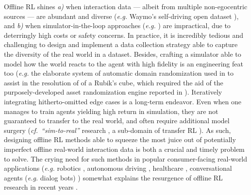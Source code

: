Offline RL shines
\textit{a)} when interaction data --- albeit from multiple non-egocentric sources --- are abundant and diverse
(\textit{e.g.} Waymo's self-driving open dataset \cite{Sun2019-qc}), and
\textit{b)} when simulator-in-the-loop approaches
(\textit{e.g.} \cite{Ajay2019-lv, Zhou2020-hs})
are impractical, due to deterringly high costs or safety concerns.
In practice, it is incredibly tedious and challenging to design and implement
a data collection strategy able to capture the
diversity of the real world in a dataset.
Besides, crafting a simulator able to model how the world reacts to the agent with high fidelity
is an engineering feat too
(\textit{e.g.} the elaborate system of automatic domain randomization used in \cite{OpenAI2019-vy}
to assist in the resolution of of a Rubik's cube, which required the aid of the purposely-developed
asset randomization engine reported in \cite{Chociej2019-ot}).
Iteratively integrating hitherto-omitted edge cases is a long-term endeavor.
Even when one manages to train agents yielding high return in simulation, they are not guaranteed to
transfer to the real world, and often require additional model surgery
(\textit{cf.}~\textit{``sim-to-real''} research
\cite{Heiden2021-fb, Ho2020-qs, Smith2019-ns, James2018-pe, OpenAI2018-sm,
Tan2018-ux, Bousmalis2017-fm, Tobin2017-ir, Rusu2016-dc},
a sub-domain of transfer RL
\cite{Taylor2009-pc, Parisotto2016-fo, Barreto2016-ey, Gupta2017-fd,
Berseth2018-lc, Wang2018-ot, Nichol2018-gr, Gamrian2019-ok, Peng2020-un}).
As such, designing offline RL methods able to squeeze the most juice out of potentially imperfect
offline real-world interaction data is both a crucial and timely problem to solve.
The crying need for such methods in popular consumer-facing
real-world applications (\textit{e.g.} robotics \cite{Cabi2019-nt, Mandlekar2019-el},
autonomous driving \cite{Chen2015-sg, Gonzalez2016-vt, Bojarski2016-uz, Sallab2017-va, Maddern2017-yu,
Codevilla2018-cp, Mehta2018-xc, Rhinehart2018-vx, Sun2018-ua, Kendall2019-vo, Sun2019-qc, Huang2020-vh,
Gao2020-xu, Yurtsever2020-ow, Gu2020-fo, Geyer2020-uy},
healthcare \cite{Johnson2016-bf, Gottesman2018-oq, Gottesman2019-ne, Futoma2020-yd},
conversational agents (\textit{e.g.} dialog bots)
\cite{Henderson2005-ie, Pietquin2011-tt, Zhou2017-ir, Gao2020-jg, Jaques2020-gb})
somewhat explains the resurgence of offline RL research in recent years \cite{Levine2020-hz}.

